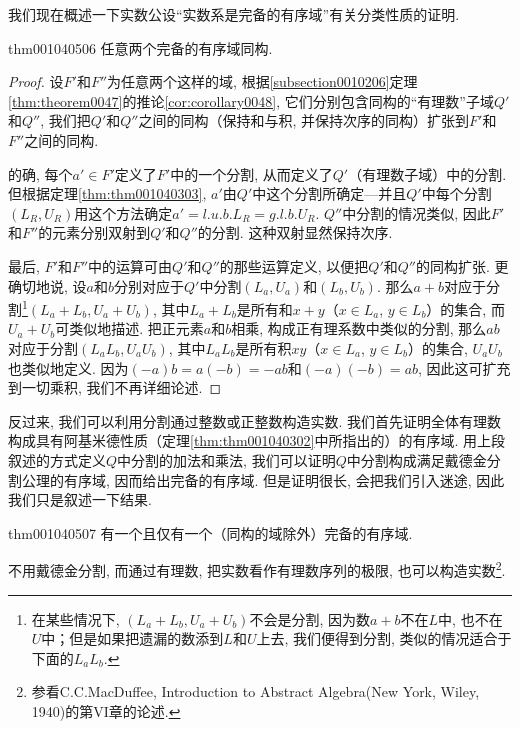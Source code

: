 我们现在概述一下实数公设“实数系是完备的有序域”有关分类性质的证明. 

\begin{theorem}{}{thm001040506}
任意两个完备的有序域同构. 
\end{theorem}

\begin{proof}
设$F'$和$F''$为任意两个这样的域, 根据\ref{subsection0010206}定理\ref{thm:theorem0047}的推论\ref{cor:corollary0048}, 它们分别包含同构的“有理数”子域$Q'$和$Q''$, 我们把$Q'$和$Q''$之间的同构（保持和与积, 并保持次序的同构）扩张到$F'$和$F''$之间的同构. 

的确, 每个$a' \in F'$定义了$F'$中的一个分割, 从而定义了$Q'$（有理数子域）中的分割. 但根据定理\ref{thm:thm001040303}, $a'$由$Q'$中这个分割所确定---并且$Q'$中每个分割$(L_R, U_R)$用这个方法确定$a'=l.u.b.L_R = g.l.b.U_R$. $Q''$中分割的情况类似, 因此$F'$和$F''$的元素分别双射到$Q'$和$Q''$的分割. 这种双射显然保持次序. 

最后, $F'$和$F''$中的运算可由$Q'$和$Q''$的那些运算定义, 以便把$Q'$和$Q''$的同构扩张. 更确切地说, 设$a$和$b$分别对应于$Q'$中分割$(L_a, U_a)$和$(L_b, U_b)$. 那么$a+b$对应于分割\footnote{在某些情况下, $(L_a+L_b, U_a+U_b)$不会是分割, 因为数$a+b$不在$L$中, 也不在$U$中；但是如果把遗漏的数添到$L$和$U$上去, 我们便得到分割, 类似的情况适合于下面的$L_aL_b$.}$(L_a+L_b, U_a+U_b)$, 其中$L_a+L_b$是所有和$x+y$（$x \in L_a$, $y \in L_b$）的集合, 而$U_a+U_b$可类似地描述. 把正元素$a$和$b$相乘, 构成正有理系数中类似的分割, 那么$ab$对应于分割$(L_aL_b, U_aU_b)$, 其中$L_aL_b$是所有积$xy$（$x \in L_a$, $y \in L_b$）的集合, $U_aU_b$也类似地定义. 因为$(-a)b=a(-b)=-ab$和$(-a)(-b)=ab$, 因此这可扩充到一切乘积, 我们不再详细论述.  
\end{proof}

反过来, 我们可以利用分割通过整数或正整数构造实数. 我们首先证明全体有理数构成具有阿基米德性质（定理\ref{thm:thm001040302}中所指出的）的有序域. 用上段叙述的方式定义$Q$中分割的加法和乘法, 我们可以证明$Q$中分割构成满足戴德金分割公理的有序域, 因而给出完备的有序域. 但是证明很长, 会把我们引入迷途, 因此我们只是叙述一下结果. 

\begin{theorem}{}{thm001040507}
有一个且仅有一个（同构的域除外）完备的有序域. 
\end{theorem}

不用戴德金分割, 而通过有理数, 把实数看作有理数序列的极限, 也可以构造实数\footnote{参看C.C.MacDuffee, Introduction to Abstract Algebra(New York, Wiley, 1940)的第VI章的论述. }. 

